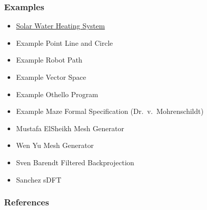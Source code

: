 \documentclass[t,12pt,numbers,fleqn]{beamer}
\begin{document}
\begin{frame}
\frametitle{Examples}

\begin{itemize}
\item
  \href{https://github.com/smiths/swhs/blob/master/docs/Design/MIS/PCM_MIS.pdf} {Solar Water Heating System}
\item Example Point Line and Circle
\item Example Robot Path
\item Example Vector Space
\item Example Othello Program
\item Example Maze Formal Specification (Dr.\ v.\ Mohrenschildt)
\item Mustafa ElSheikh Mesh Generator \cite{CaretteEtAl2011}
\item Wen Yu Mesh Generator \cite{SmithAndYu2009}
\item Sven Barendt Filtered Backprojection
\item Sanchez sDFT
\end{itemize}

\end{frame}


\begin{frame}[allowframebreaks]
\frametitle{References}



\end{frame}

\end{document}
